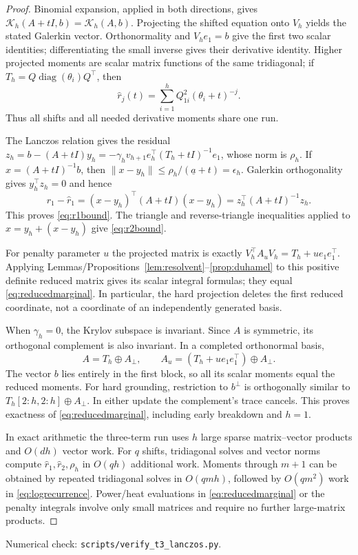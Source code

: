 \documentclass[11pt]{article}
\DeclareMathOperator{\diag}{diag}
\begin{document}
\begin{proof}
Binomial expansion, applied in both directions, gives
$\mathcal K_h(A+tI,b)=\mathcal K_h(A,b)$.
Projecting the shifted equation onto $V_h$ yields the stated Galerkin
vector. Orthonormality and $V_he_1=b$ give the first two scalar
identities; differentiating the small inverse gives their derivative
identity. Higher projected moments are scalar matrix functions of the
same tridiagonal; if $T_h=Q\diag(\theta_i)Q^\top$, then
\[
 \widehat r_j(t)=\sum_{i=1}^h Q_{1i}^2(\theta_i+t)^{-j}.
\]
Thus all shifts and all needed derivative moments share one run.

The Lanczos relation gives the residual
$z_h=b-(A+tI)y_h=-\gamma_hv_{h+1}e_h^\top(T_h+tI)^{-1}e_1$,
whose norm is $\rho_h$. If $x=(A+tI)^{-1}b$, then
$\|x-y_h\|\leq\rho_h/(\underline a+t)=\epsilon_h$.
Galerkin orthogonality gives $y_h^\top z_h=0$ and hence
\[
 r_1-\widehat r_1
 =(x-y_h)^\top(A+tI)(x-y_h)
 =z_h^\top(A+tI)^{-1}z_h.
\]
This proves \eqref{eq:r1bound}. The triangle and reverse-triangle
inequalities applied to $x=y_h+(x-y_h)$ give \eqref{eq:r2bound}.

For penalty parameter $u$ the projected matrix is exactly
$V_h^\top A_uV_h=T_h+ue_1e_1^\top$. Applying
Lemmas/Propositions~\ref{lem:resolvent}--\ref{prop:duhamel} to this
positive definite reduced matrix gives its scalar integral formulas;
they equal \eqref{eq:reducedmarginal}. In particular, the hard
projection deletes the first reduced coordinate, not a coordinate of
an independently generated basis.

When $\gamma_h=0$, the Krylov subspace is invariant. Since $A$ is
symmetric, its orthogonal complement is also invariant. In a completed
orthonormal basis,
\[
 A=T_h\oplus A_\perp,\qquad
 A_u=(T_h+ue_1e_1^\top)\oplus A_\perp.
\]
The vector $b$ lies entirely in the first block, so all its scalar
moments equal the reduced moments. For hard grounding, restriction
to $b^\perp$ is orthogonally similar to
$T_h[2:h,2:h]\oplus A_\perp$. In either update the complement's
trace cancels. This proves exactness of \eqref{eq:reducedmarginal},
including early breakdown and $h=1$.

In exact arithmetic the three-term run uses $h$ large sparse
matrix--vector products and $O(dh)$ vector work. For $q$ shifts,
tridiagonal solves and vector norms compute
$\widehat r_1,\widehat r_2,\rho_h$ in $O(qh)$ additional work.
Moments through $m+1$ can be obtained by repeated tridiagonal solves
in $O(qmh)$, followed by $O(qm^2)$ work in
\eqref{eq:logrecurrence}. Power/heat evaluations in
\eqref{eq:reducedmarginal} or the penalty integrals involve only small
matrices and require no further large-matrix products.
\end{proof}
\noindent Numerical check: \texttt{scripts/verify\_t3\_lanczos.py}.
\end{document}
